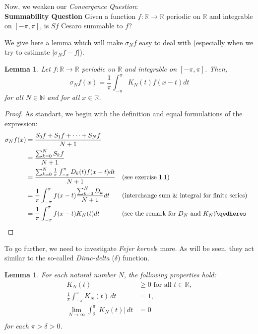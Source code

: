 \documentclass[12pt]{amsart}
\newtheorem{lemma}[theorem]{Lemma}
\theoremstyle{definition}
\begin{document}
Now, we weaken our \textit{Convergence Question}: \\


\textbf{Summability Question} Given a function $f: \mathbb{R} \xrightarrow{} \mathbb{R} $ periodic on $\mathbb{R}$ and integrable on $[-\pi, \pi]$, is $Sf$ Cesaro summable to \(f\)?\par
We give here a lemma which will make $\sigma_N f$ easy to deal with (especially when we try to estimate $|\sigma_N f - f|$).


\begin{lemma}\label{convolutio for sigma_N with K_N}
    Let $f: \mathbb{R} \xrightarrow{} \mathbb{R} $ periodic on $\mathbb{R}$ and integrable on $[-\pi, \pi]$. Then,
    \[
    \sigma_Nf(x) = \frac{1}{\pi} \int_{-\pi}^{\pi} K_N(t)f(x-t)dt
    \]
    for all $N \in \mathbb{N}$ and for all $ x \in \mathbb{R}$.\footnotemark{}
\end{lemma}


\begin{proof} As standart, we begin with the definition and equal formulations of the expression:
    \begin{align*}
    \sigma_Nf(x) &= \frac{S_0f + S_1f + \dots + S_Nf}{N+1}\\
                 &= \frac{\sum_{k = 0}^{N}S_kf}{N+1} \\
                 &= \frac{\sum_{k = 0}^{N}\frac{1}{\pi}\int_{-\pi}^{\pi}D_k(t)f(x-t)dt}{N+1} &&\text{(see exercise 1.1)}\\
                 &= \frac{1}{\pi}\int_{-\pi}^{\pi}f(x-t)\frac{\sum_{k = 0}^{N}D_k}{N+1}dt &&\text{(interchange sum \& integral for finite series)}\\
                 &= \frac{1}{\pi}\int_{-\pi}^{\pi}f(x-t)K_N(t)dt &&\text{(see the remark for $D_N$ and $K_N$)}\qedheres
    \end{align*}
\end{proof}


\par
To go further, we need to investigate \textit{Fejer kernel}s more. As will be seen, they act similar to the so-called \textit{Dirac-delta} ($\delta$) function.


\begin{lemma}\label{properties of K_N}
    For each natural number $N$, the following properties hold:
    \begin{align*}
        K_N(t) &\geq 0 \text{ for all } t \in \mathbb{R}, \\
        \frac{1}{\pi}\int_{-\pi}^{\pi} K_N(t) \, dt &= 1, \\
        \lim_{N \to \infty} \int_{\delta}^{\pi} |K_N(t)| \, dt &= 0 \\ 
    \end{align*}
for each $\pi > \delta > 0$.
\end{lemma}
\end{document}
